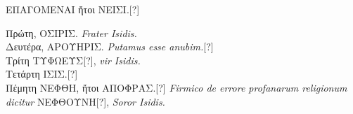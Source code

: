 %
\centering
%
\begin{minipage}{0.6\textwidth}
  \begin{center}
    \textgreek{ΕΠΑΓΟΜΕΝΑΙ ἤτοι ΝΕΙΣΙ.}[?]\\
  \end{center}
  \textgreek{Πρώτη, ΟΣΙΡΙΣ.} \textit{Frater Isidis.}\\
  \textgreek{Δευτέρα, ΑΡΟΥΗΡΙΣ.} \textit{Putamus esse anubim.}[?]\\
  \textgreek{Τρίτη ΤΥΦΩΕΥΣ}[?], \textit{vir Isidis.}\\
  \textgreek{Τετάρτη ΙΣΙΣ.}[?]\\
  \textgreek{Πέμητη ΝΕΦΘΗ, ἤτοι ΑΠΟΦΡΑΣ.}[?]
    \textit{Firmico de errore profanarum religionum dicitur}
    \textgreek{ΝΕΦΘΟΥΝΗ}[?], \textit{Soror Isidis.}
\end{minipage}
\caption[\textgreek{Επαγομεναι ἤτοι Νεισι}]{}
\label{tab:p195}
